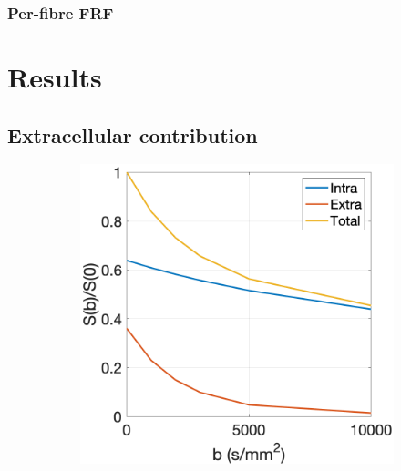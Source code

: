 \subsubsection{Per-fibre \ac{FRF}}
\label{sec:frf_sig_proc_per_fibre}




\section{Results}
\label{sec:frf_results}

\subsection{Extracellular contribution}
\label{sec:frf_res_extracellular}

\begin{figure}
  \centering
  \begin{subfigure}[]{0.4\textwidth}
    \includegraphics[width=\textwidth]{figures/frf_experiment/in_ex_tot_Kappa_2.png}
    \caption{}
  \end{subfigure}
  ~
  \begin{subfigure}[]{0.4\textwidth}

\end{subfigure}
\end{figure}
